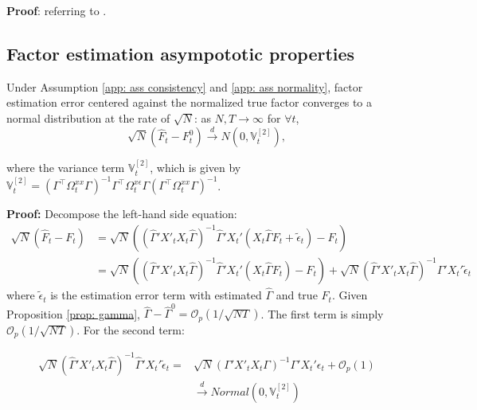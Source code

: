 \documentclass[12pt]{article}
\begin{document}
\textbf{Proof}: referring to \cite{kelly2020instrumented}.

\subsection{Factor estimation asympototic properties}
\begin{proposition}
\label{prop: factor}
Under Assumption \ref{app: ass consistency} and \ref{app: ass normality}, factor estimation error centered against the normalized true factor converges to a normal distribution at the rate of $\sqrt{N}$: as $N, T \to \infty$ for $\forall t$,
$$
\sqrt{N}\left(\hat{F}_t - F^0_t\right) \xrightarrow{d} N\left(0, \mathbb{V}_t^{[2]}\right),
$$
\end{proposition}
where the variance term $\mathbb{V}_{t}^{[2]}$, which is given by $\mathbb{V}_{t}^{[2]} = \left( \Gamma^\top \Omega_{t}^{xx} \Gamma\right)^{-1} \Gamma^\top \Omega_{t}^{x\epsilon} \Gamma \left(\Gamma^\top\Omega_{t}^{xx} \Gamma\right)^{-1}$.

\textbf{Proof:} Decompose the left-hand side equation:
\begin{equation*}
\begin{aligned}
\sqrt{N}\left(\hat{F}_t - F_t\right) &= \sqrt{N}\left(\left( \hat{\Gamma}'X'_tX_t\hat{\Gamma} \right)^{-1}\hat{\Gamma}'X_t' \left(X_t\hat{\Gamma}F_t+ \tilde{\epsilon}_t \right) - F_t\right)\\
&= \sqrt{N}\left(\left( \hat{\Gamma}'X'_tX_t\hat{\Gamma} \right)^{-1}\hat{\Gamma}'X_t' \left(X_t \hat{\Gamma}F_t\right) - F_t\right) + \sqrt{N}\left( \hat{\Gamma}'X'_tX_t\hat{\Gamma} \right)^{-1}\hat{\Gamma}'X_t'\tilde{\epsilon}_t
\end{aligned}
\end{equation*}
where $\tilde{\epsilon}_t$ is the estimation error term with estimated $\hat\Gamma$ and true $F_t$. Given Proposition \ref{prop: gamma}, $\hat{\Gamma} - \hat{\Gamma}^0 = \mathcal{O}_p \left( 1/\sqrt{NT} \right)$. The first term is simply $\mathcal{O}_p\left(1/\sqrt{NT}\right)$. For the second term:

\begin{equation*}
\begin{aligned}
\sqrt{N}\left( \hat{\Gamma}'X'_tX_t\hat{\Gamma} \right)^{-1}\hat{\Gamma}'X_t'\tilde{\epsilon}_t = &\sqrt{N}\left( \Gamma'X'_tX_t\Gamma \right)^{-1}\Gamma'X_t'\epsilon_t + \mathcal{O}_p(1) \\
& \xrightarrow{d} Normal(0, \mathbb{V}_t^{[2]})
\end{aligned}
\end{equation*}
\end{document}
